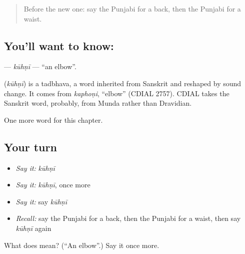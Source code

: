 \label{lesson:PA-C135-kuhni}



\begin{quote}
Before the new one: say the Punjabi for a back, then the Punjabi for a waist.
\end{quote}

\subsection*{You'll want to know: }
\textbf{} — \emph{kūhṇī} — \textquotedblleft{}an elbow\textquotedblright{}.

\begin{cousinweb}
\textbf{} (\emph{kūhṇī}) is a tadbhava, a word inherited from Sanskrit and reshaped by sound change. It comes from \emph{kaphoṇi}, \textquotedblleft{}elbow\textquotedblright{} (CDIAL 2757). CDIAL takes the Sanskrit word, probably, from Munda rather than Dravidian.
\end{cousinweb}

\begin{grammarlens}[title={What you've built}]
One more word for this chapter.
\end{grammarlens}

\subsection*{Your turn}
\begin{itemize}
\raggedright
  \item \emph{Say it:} \emph{kūhṇī}
  \item \emph{Say it:} \emph{kūhṇī}, once more
  \item \emph{Say it:} say \emph{kūhṇī}
  \item \emph{Recall:} say the Punjabi for a back, then the Punjabi for a waist, then say \emph{kūhṇī} again
\end{itemize}

\begin{tcolorbox}[breakable,colback=teal!4,colframe=teal!35!black,title={Before you move on}]
What does  mean? (\textquotedblleft{}An elbow\textquotedblright{}.) Say it once more.
\end{tcolorbox}
